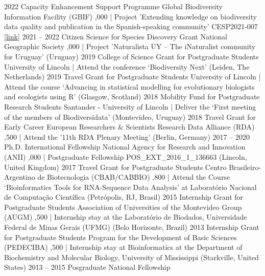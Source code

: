 \documentclass[9pt]{developercv} %
\begin{document}

\begin{entrylist}
	\entry
		{2022}
		{Capacity Enhancement Support Programme}
		{Global Biodiversity Information Facility (GBIF)}
		{,000 | Project 'Extending knowledge on biodiversity data quality and publication in the Spanish-speaking community' CESP2021-007 [\href{https://www.gbif.org/project/CESP2021-007/}{link}]}
	\entry
		{2021 -- 2022}
		{Citizen Science for Species Discovery Grant}
		{National Geographic Society}
		{,000 | Project 'Naturalista UY – The iNaturalist community for Uruguay' (Uruguay)}
	\entry
		{2019}
		{College of Science Grant for Postgraduate Students}
		{University of Lincoln }
		{ | Attend the conference ‘Biodiversity Next’ (Leiden, The Netherlands)}
	\entry
		{2019}
		{Travel Grant for Postgraduate Students}
		{University of Lincoln }
		{ | Attend the course ‘Advancing in statistical modelling for evolutionary biologists and ecologists using R’ (Glasgow, Scotland)}
	\entry
		{2018}
		{Mobility Fund for Postgraduate Research Students}
		{Santander - University of Lincoln}
		{ | Deliver the ‘First meeting of the members of Biodiversidata’ (Montevideo, Uruguay)}
	\entry
		{2018}
		{Travel Grant for Early Career European Researchers \& Scientists }
		{Research Data Alliance (RDA)}
		{,500 | Attend the '11th RDA Plenary Meeting’ (Berlin, Germany)}
	\entry
		{2017 -- 2020}
		{Ph.D. International Fellowship}
		{National Agency for Research and Innovation (ANII)}
		{,000 | Postgraduate Fellowship POS\_EXT\_2016\_1\_136663 (Lincoln, United Kingdom)}
	\entry
		{2017}
		{Travel Grant for Postgraduate Students}
		{Centro Brasileiro-Argentino de Biotecnologia (CBAB/CABBIO)}
		{,800 | Attend the Course ‘Bioinformatics Tools for RNA-Sequence Data Analysis’ at Laboratório Nacional de Computação Científica (Petrópolis, RJ, Brasil)}
	\entry
		{2015}
		{Internship Grant for Postgraduate Students}
		{Association of Universities of the Montevideo Group (AUGM)}
		{,500 | Internship stay at the Laboratório de Biodados, Universidade Federal de Minas Gerais (UFMG) (Belo Horizonte, Brazil)}
	\entry
		{2013}
		{Internship Grant for Postgraduate Students}
		{Program for the Development of Basic Sciences (PEDECIBA)}
		{,500 | Internship stay at Bioinformatics at the Department of Biochemistry and Molecular Biology, University of Mississippi (Starkville, United States)}
	\entry
		{2013 -- 2015}
		{Posgraduate National Fellowship}

\end{entrylist}
\end{document}
